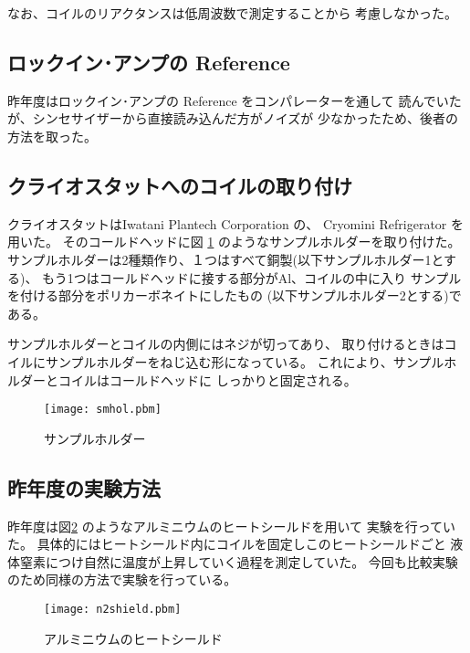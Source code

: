 なお、コイルのリアクタンスは低周波数で測定することから
考慮しなかった。

\subsection{ロックイン･アンプの Reference}\label{subsec:reference}

昨年度はロックイン･アンプの Reference をコンパレーターを通して
読んでいたが、シンセサイザーから直接読み込んだ方がノイズが
少なかったため、後者の方法を取った。

\subsection{クライオスタットへのコイルの取り付け}\label{subsec:cryostat}


クライオスタットはIwatani Plantech Corporation の、
Cryomini Refrigerator を用いた。
そのコールドヘッドに図 \ref{fig:sampleholder}
のようなサンプルホルダーを取り付けた。
サンプルホルダーは2種類作り、１つはすべて銅製(以下サンプルホルダー1とする)、
もう1つはコールドヘッドに接する部分がAl、コイルの中に入り
サンプルを付ける部分をポリカーボネイトにしたもの
(以下サンプルホルダー2とする)である。

サンプルホルダーとコイルの内側にはネジが切ってあり、
取り付けるときはコイルにサンプルホルダーをねじ込む形になっている。
これにより、サンプルホルダーとコイルはコールドヘッドに
しっかりと固定される。

\begin{figure}[htb]
	\begin{center}
	\texttt{[image: smhol.pbm]}
	\end{center}
	\caption{サンプルホルダー}
	\label{fig:sampleholder}
\end{figure}

\subsection{昨年度の実験方法}

昨年度は図\ref{fig:N2shield}
のようなアルミニウムのヒートシールドを用いて
実験を行っていた。
具体的にはヒートシールド内にコイルを固定しこのヒートシールドごと
液体窒素につけ自然に温度が上昇していく過程を測定していた。
今回も比較実験のため同様の方法で実験を行っている。

\begin{figure}[htbp]
	\begin{center}
	\texttt{[image: n2shield.pbm]}
	\end{center}
	
\caption{アルミニウムのヒートシールド}
\label{fig:N2shield}
\end{figure}

